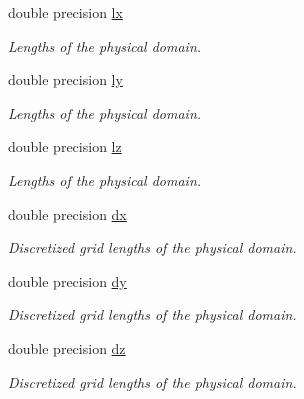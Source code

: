 \textbf{ }\par
\begin{DoxyCompactItemize}
\item 
double precision \mbox{\hyperlink{namespaceglobal_ac5d2ea39fc192fbb8354e665dc91b759}{lx}}
\begin{DoxyCompactList}\small\item\em Lengths of the physical domain. \end{DoxyCompactList}\item 
double precision \mbox{\hyperlink{namespaceglobal_a6a6ee40bbab9e114aa217f7d8570b924}{ly}}
\begin{DoxyCompactList}\small\item\em Lengths of the physical domain. \end{DoxyCompactList}\item 
double precision \mbox{\hyperlink{namespaceglobal_a9d90050855b894304d8b4272c6a9ee71}{lz}}
\begin{DoxyCompactList}\small\item\em Lengths of the physical domain. \end{DoxyCompactList}\end{DoxyCompactItemize}

\textbf{ }\par
\begin{DoxyCompactItemize}
\item 
double precision \mbox{\hyperlink{namespaceglobal_a9c5f8c3cf5f9b496608059fc13776b4c}{dx}}
\begin{DoxyCompactList}\small\item\em Discretized grid lengths of the physical domain. \end{DoxyCompactList}\item 
double precision \mbox{\hyperlink{namespaceglobal_aa2d01c0b9c06af88ae13136658fc3dd9}{dy}}
\begin{DoxyCompactList}\small\item\em Discretized grid lengths of the physical domain. \end{DoxyCompactList}\item 
double precision \mbox{\hyperlink{namespaceglobal_a4015487c561985eefa8cabc39f591540}{dz}}
\begin{DoxyCompactList}\small\item\em Discretized grid lengths of the physical domain. \end{DoxyCompactList}\end{DoxyCompactItemize}



